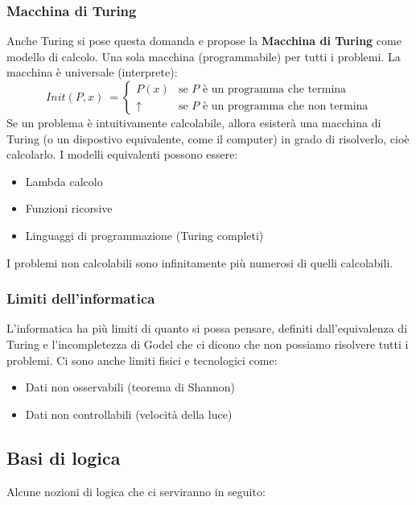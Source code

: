 \documentclass[a4paper]{article}
\begin{document}
\subsubsection{Macchina di Turing} 

Anche Turing si pose questa domanda e propose la \textbf{Macchina di Turing} come modello di calcolo.
Una sola macchina (programmabile) per tutti i problemi.
La macchina è universale (interprete):
\[Init(P,x)\ = \begin{cases}
    P(x) & \text{se } P \text{ è un programma che termina}\\
    \uparrow & \text{se } P \text{ è un programma che non termina}
\end{cases}\]
Se un problema è intuitivamente calcolabile, allora esisterà una macchina di Turing (o un dispostivo
equivalente, come il computer) in grado di risolverlo, cioè calcolarlo.
I modelli equivalenti possono essere:
\begin{itemize}
    \item Lambda calcolo 
    \item Funzioni ricorsive
    \item Linguaggi di programmazione (Turing completi)
\end{itemize}
I problemi non calcolabili sono infinitamente più numerosi di quelli calcolabili.
\subsubsection{Limiti dell'informatica}

L'informatica ha più limiti di quanto si possa pensare, definiti dall'equivalenza di Turing
e l'incompletezza di Godel che ci dicono che non possiamo risolvere tutti i problemi.
Ci sono anche limiti fisici e tecnologici come:
\begin{itemize}
    \item Dati non osservabili (teorema di Shannon)
    \item Dati non controllabili (velocità della luce)
\end{itemize}

\subsection{Basi di logica}

Alcune nozioni di logica che ci serviranno in seguito:
\end{document}
